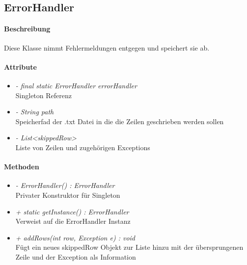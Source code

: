 \subsection{ErrorHandler}

\paragraph{Beschreibung}
Diese Klasse nimmt Fehlermeldungen entgegen und speichert sie ab.

\paragraph{Attribute}
\begin{itemize}
\item \textit{ - final static ErrorHandler errorHandler}
\\ Singleton Referenz
\item \textit{ - String path}
\\ Speicherfad der .txt Datei in die die Zeilen geschrieben werden sollen
\item \textit{ - List<skippedRow>}
\\ Liste von Zeilen und zugehörigen Exceptions
\end{itemize}

\paragraph{Methoden}

\begin{itemize}
\item \textit{ - ErrorHandler() : ErrorHandler}  \\Privater Konstruktor für Singleton
\item \textit{ + static getInstance() : ErrorHandler} \\Verweist auf die ErrorHandler Instanz
\item \textit{ + addRows(int row, Exception e) : void}
\\Fügt ein neues skippedRow Objekt zur Liste hinzu mit der übersprungenen Zeile und der Exception als Information 

\end{itemize}